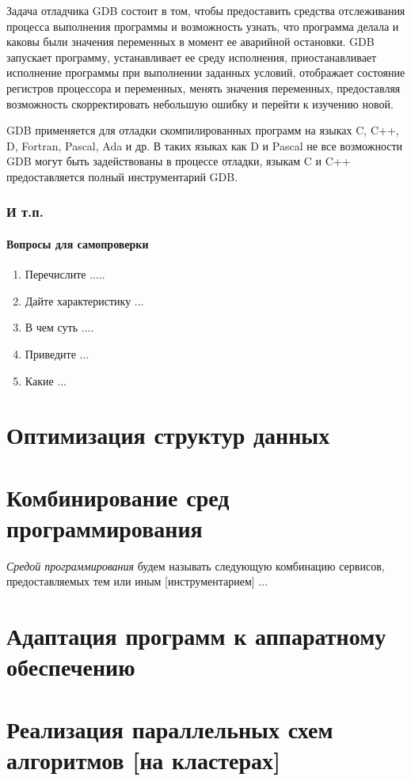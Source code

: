 \documentclass[14pt, openany, twoside, draft]{extbook} %
\newcommand{\e}[2][fcolor]{\textcolor{pcolor}{[}\textcolor{#1}{#2}\textcolor{pcolor}{]}}
\newenvironment{questions}{\subsubsection*{Вопросы для самопроверки}\begin{enumerate}\itemsep0pt minus 0.3pt\parskip0pt plus 0.3pt}{\end{enumerate}}
\begin{document}
Задача отладчика GDB состоит в том, чтобы предоставить средства
отслеживания процесса выполнения программы и возможность узнать, что
программа делала и каковы были значения переменных в момент ее
аварийной остановки.  GDB запускает программу, устанавливает ее среду
исполнения, приостанавливает исполнение программы при выполнении
заданных условий, отображает состояние регистров процессора и
переменных, менять значения переменных, предоставляя возможность
скорректировать небольшую ошибку и перейти к изучению новой.

GDB применяется для отладки скомпилированных программ на языках C,
C++, D, Fortran, Pascal, Ada и др.  В таких языках как D и Pascal не
все возможности GDB могут быть задействованы в процессе отладки,
языкам C и C++ предоставляется полный инструментарий GDB.

\subsection{И т.п.}


\begin{questions}
\item{} Перечислите .....
\item{} Дайте характеристику ...
\item{} В чем суть ....
\item{} Приведите ...
\item{} Какие ...
\end{questions}

\chapter{Оптимизация структур данных}

\chapter{Комбинирование сред программирования}

\emph{Средой программирования} будем называть следующую
комбинацию сервисов, предоставляемых тем или иным \e{инструментарием} ...

\chapter{Адаптация программ к аппаратному обеспечению}

\chapter{Реализация параллельных схем алгоритмов \e{на кластерах}}
\end{document}

